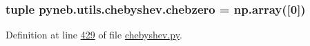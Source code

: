 \hypertarget{namespacepyneb_1_1utils_1_1chebyshev_ad707fa9ec865920c2d8eedf6dfedf21c}{
\subsubsection[{chebzero}]{\setlength{\rightskip}{0pt plus 5cm}tuple pyneb.\-utils.\-chebyshev.\-chebzero = np.\-array(\mbox{[}0\mbox{]})}}\label{namespacepyneb_1_1utils_1_1chebyshev_ad707fa9ec865920c2d8eedf6dfedf21c}


Definition at line \hyperlink{chebyshev_8py_source_l00429}{429} of file \hyperlink{chebyshev_8py_source}{chebyshev.\-py}.

